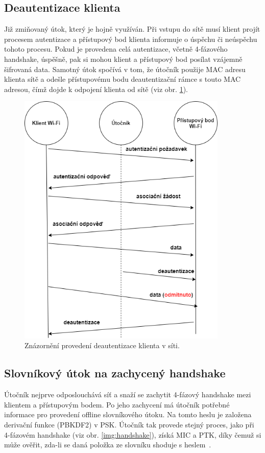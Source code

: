 \subsection{Deautentizace klienta}
Již zmiňovaný útok, který je hojně využíván. Při vstupu do sítě musí klient projít procesem autentizace a přístupový bod klienta informuje o úspěchu či neúspěchu tohoto procesu. Pokud je provedena celá autentizace, včetně 4-fázového handshake, úspěšně, pak si mohou klient a přístupový bod posílat vzájemně šifrovaná data. Samotný útok spočívá v tom, že útočník použije MAC adresu klienta sítě a odešle přístupovému bodu deautentizační rámce s touto MAC adresou, čímž dojde k odpojení klienta od sítě (viz obr. \ref{img:deauth}). 
\begin{figure}[htbp]
  \centering
  \includegraphics[width=10cm]{obrazky-figures/deauth.png}
  \caption{Znázornění provedení deautentizace klienta v síti.}
  \label{img:deauth}
\end{figure}

\subsection{Slovníkový útok na zachycený handshake}
Útočník nejprve odposlouchává síť a snaží se zachytit 4-fázový handshake mezi klientem a přístupovým bodem. Po jeho zachycení má útočník potřebné informace pro provedení offline slovníkového útoku. Na tomto heslu je založena derivační funkce (PBKDF2) v PSK. Útočník tak provede stejný proces, jako při 4-fázovém handshake (viz obr. \ref{img:handshake}), získá MIC a PTK, díky čemuž si může ověřit, zda-li se daná položka ze slovníku shoduje s heslem~\cite{kumkar2012vulnerabilities}. 

